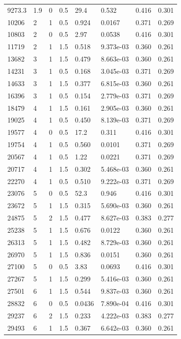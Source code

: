 \documentclass[preview]{standalone}
\begin{document}
{{\begin{tabular}{L{1.2cm}C{1.2cm} C{0.3cm}C{0.5cm} C{1.4cm}C{1.4cm} C{1.4cm}C{1.4cm}}
  9273.3  &   1.9  & 0     & 0.5 &  29.4  & 0.532  & 0.416 &  0.301   \\ 
  10206  &     2  & 1     & 0.5 &  0.924  & 0.0167  & 0.371 &  0.269   \\ 
  10803  &     2  & 0     & 0.5 &  2.97  & 0.0538  & 0.416 &  0.301   \\ 
  11719  &     2  & 1     & 1.5 &  0.518  & 9.373e-03  & 0.360 &  0.261   \\ 
  13682  &     3  & 1     & 1.5 &  0.479  & 8.663e-03  & 0.360 &  0.261   \\ 
  14231  &     3  & 1     & 0.5 &  0.168  & 3.045e-03  & 0.371 &  0.269   \\ 
  14633  &     3  & 1     & 1.5 &  0.377  & 6.815e-03  & 0.360 &  0.261   \\ 
  16396  &     3  & 1     & 0.5 &  0.154  & 2.779e-03  & 0.371 &  0.269   \\ 
  18479  &     4  & 1     & 1.5 &  0.161  & 2.905e-03  & 0.360 &  0.261   \\ 
  19025  &     4  & 1     & 0.5 &  0.450  & 8.139e-03  & 0.371 &  0.269   \\ 
  19577  &     4  & 0     & 0.5 &  17.2  & 0.311  & 0.416 &  0.301   \\ 
  19754  &     4  & 1     & 0.5 &  0.560  & 0.0101  & 0.371 &  0.269   \\ 
  20567  &     4  & 1     & 0.5 &  1.22  & 0.0221  & 0.371 &  0.269   \\ 
  20717  &     4  & 1     & 1.5 &  0.302  & 5.468e-03  & 0.360 &  0.261   \\ 
  22270  &     4  & 1     & 0.5 &  0.510  & 9.222e-03  & 0.371 &  0.269   \\ 
  23076  &     5  & 0     & 0.5 &  52.3  & 0.946  & 0.416 &  0.301   \\ 
  23672  &     5  & 1     & 1.5 &  0.315  & 5.690e-03  & 0.360 &  0.261   \\ 
  24875  &     5  & 2     & 1.5 &  0.477  & 8.627e-03  & 0.383 &  0.277   \\ 
  25238  &     5  & 1     & 1.5 &  0.676  & 0.0122  & 0.360 &  0.261   \\ 
  26313  &     5  & 1     & 1.5 &  0.482  & 8.729e-03  & 0.360 &  0.261   \\ 
  26970  &     5  & 1     & 1.5 &  0.836  & 0.0151  & 0.360 &  0.261   \\ 
  27100  &     5  & 0     & 0.5 &  3.83  & 0.0693  & 0.416 &  0.301   \\ 
  27267  &     5  & 1     & 1.5 &  0.299  & 5.416e-03  & 0.360 &  0.261   \\ 
  27501  &     6  & 1     & 1.5 &  0.544  & 9.837e-03  & 0.360 &  0.261   \\ 
  28832  &     6  & 0     & 0.5 &  0.0436  & 7.890e-04  & 0.416 &  0.301   \\ 
  29237  &     6  & 2     & 1.5 &  0.233  & 4.222e-03  & 0.383 &  0.277   \\ 
  29493  &     6  & 1     & 1.5 &  0.367  & 6.642e-03  & 0.360 &  0.261   \\ 
\hline 
\end{tabular} 

}}
\end{document}
